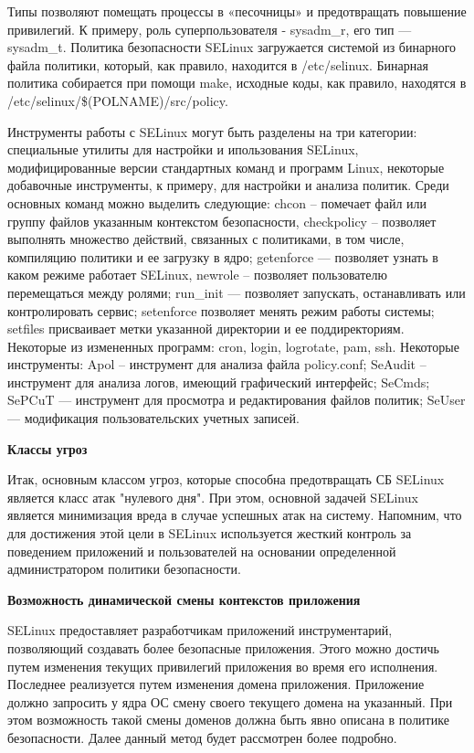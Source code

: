 Типы позволяют помещать 
процессы в «песочницы» и предотвращать повышение 
привилегий. К примеру, роль суперпользователя - 
sysadm\_r, его тип — sysadm\_t. Политика безопасности 
SELinux загружается системой из бинарного файла политики,
который, как правило, находится в /etc/selinux. 
Бинарная политика собирается при помощи make, исходные 
коды, как правило, находятся в /etc/selinux/\$(POLNAME)/src/policy.

Инструменты работы с SELinux могут быть разделены на 
три категории: специальные утилиты для настройки и 
ипользования SELinux, модифицированные версии стандартных 
команд и программ Linux, некоторые добавочные инструменты,
к примеру, для настройки и анализа политик. Среди основных 
команд можно выделить следующие: chcon – помечает файл или 
группу файлов указанным контекстом безопасности, checkpolicy
– позволяет выполнять множество действий, связанных с 
политиками, в том числе, компиляцию политики и ее загрузку 
в ядро; getenforce — позволяет узнать в каком режиме 
работает SELinux, newrole – позволяет пользователю 
перемещаться между ролями; run\_init — позволяет 
запускать, останавливать или контролировать сервис; 
setenforce позволяет менять режим работы системы; 
setfiles присваивает метки указанной директории и ее 
поддиректориям. Некоторые из измененных программ: cron, 
login, logrotate, pam, ssh. Некоторые инструменты: Apol 
– инструмент для анализа файла policy.conf; SeAudit – 
инструмент для анализа логов, имеющий графический интерфейс; 
SeCmds; SePCuT — инструмент для просмотра и редактирования 
файлов политик; SeUser — модификация пользовательских 
учетных записей. 

\bigskip 
{\bfseries Классы угроз} 

Итак, основным классом угроз, которые способна 
предотвращать СБ SELinux является класс атак "нулевого 
дня". При этом, основной задачей SELinux является 
минимизация вреда в случае успешных атак на систему.
Напомним, что для достижения этой цели в SELinux 
используется жесткий контроль за поведением приложений 
и пользователей на основании определенной администратором 
политики безопасности. 

\bigskip
{\bfseries Возможность динамической смены контекстов 
приложения} 
 
SELinux предоставляет разработчикам приложений 
инструментарий, позволяющий создавать более 
безопасные приложения. Этого можно достичь 
путем изменения текущих привилегий приложения 
во время его исполнения. 
Последнее реализуется путем изменения домена приложения. 
Приложение должно запросить у ядра ОС смену своего 
текущего домена на указанный. При этом возможность
такой смены доменов должна быть явно описана в 
политике безопасности. Далее данный метод будет
рассмотрен более подробно.  
\bigskip

